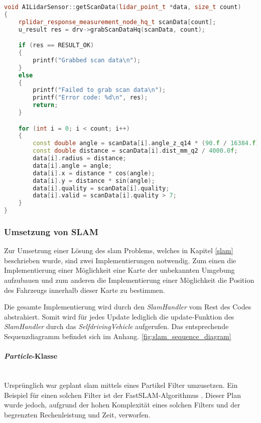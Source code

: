 \newpage
\begin{lstlisting}[caption={Auslesen der LiDAR Daten},label={lst:auslesen_lidar},language={C++}]
void A1LidarSensor::getScanData(lidar_point_t *data, size_t count)
{
    rplidar_response_measurement_node_hq_t scanData[count];
    u_result res = drv->grabScanDataHq(scanData, count);

    if (res == RESULT_OK)
    {
        printf("Grabbed scan data\n");
    }
    else
    {
        printf("Failed to grab scan data\n");
        printf("Error code: %d\n", res);
        return;
    }

    for (int i = 0; i < count; i++)
    {
        const double angle = scanData[i].angle_z_q14 * (90.f / 16384.f);
        const double distance = scanData[i].dist_mm_q2 / 4000.0f;
        data[i].radius = distance;
        data[i].angle = angle;
        data[i].x = distance * cos(angle);
        data[i].y = distance * sin(angle);
        data[i].quality = scanData[i].quality;
        data[i].valid = scanData[i].quality > 7;
    }
}
\end{lstlisting}

\subsubsection{Umsetzung von SLAM}
\label{slamImplementierung}

Zur Umsetzung einer Lösung des \ac{slam} Problems, welches in Kapitel \ref{slam} beschrieben wurde, sind zwei Implementierungen notwendig.
Zum einen die Implementierung einer Möglichkeit eine Karte der unbekannten Umgebung aufzubauen 
und zum anderen die Implementierung einer Möglichkeit die Position des Fahrzeugs innerhalb dieser Karte zu bestimmen.

Die gesamte Implementierung wird durch den \textit{SlamHandler} vom Rest des Codes abstrahiert.
Somit wird für jedes Update lediglich die update-Funktion des \textit{SlamHandler} durch das \textit{SelfdrivingVehicle} aufgerufen.
Das entsprechende Sequenzdiagramm befindet sich im Anhang. \ref{fig:slam_sequence_diagram}

\paragraph{\textit{Particle}-Klasse} \mbox{} \\
Ursprünglich war geplant \ac{slam} mittels eines Partikel Filter umzusetzen.
Ein Beispiel für einen solchen Filter ist der FastSLAM-Algorithmus \cite{montemerlo2002fastslam}.
Dieser Plan wurde jedoch, aufgrund der hohen Komplexität eines solchen Filters und der begrenzten Rechenleistung und Zeit, verworfen.


